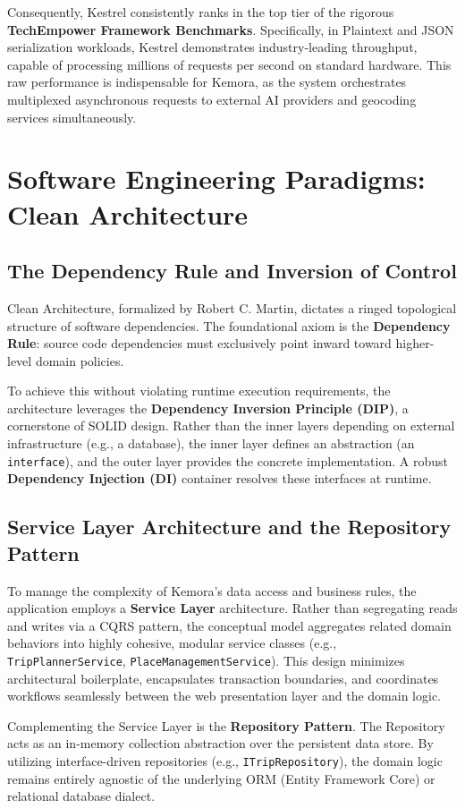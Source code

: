 Consequently, Kestrel consistently ranks in the top tier of the rigorous \textbf{TechEmpower Framework Benchmarks}. Specifically, in Plaintext and JSON serialization workloads, Kestrel demonstrates industry-leading throughput, capable of processing millions of requests per second on standard hardware. This raw performance is indispensable for Kemora, as the system orchestrates multiplexed asynchronous requests to external AI providers and geocoding services simultaneously.

\section{Software Engineering Paradigms: Clean Architecture}
\subsection{The Dependency Rule and Inversion of Control}
Clean Architecture, formalized by Robert C. Martin, dictates a ringed topological structure of software dependencies. The foundational axiom is the \textbf{Dependency Rule}: source code dependencies must exclusively point inward toward higher-level domain policies.

To achieve this without violating runtime execution requirements, the architecture leverages the \textbf{Dependency Inversion Principle (DIP)}, a cornerstone of SOLID design. Rather than the inner layers depending on external infrastructure (e.g., a database), the inner layer defines an abstraction (an \texttt{interface}), and the outer layer provides the concrete implementation. A robust \textbf{Dependency Injection (DI)} container resolves these interfaces at runtime.

\subsection{Service Layer Architecture and the Repository Pattern}
To manage the complexity of Kemora's data access and business rules, the application employs a \textbf{Service Layer} architecture. Rather than segregating reads and writes via a CQRS pattern, the conceptual model aggregates related domain behaviors into highly cohesive, modular service classes (e.g., \texttt{TripPlannerService}, \texttt{PlaceManagementService}). This design minimizes architectural boilerplate, encapsulates transaction boundaries, and coordinates workflows seamlessly between the web presentation layer and the domain logic.

Complementing the Service Layer is the \textbf{Repository Pattern}. The Repository acts as an in-memory collection abstraction over the persistent data store. By utilizing interface-driven repositories (e.g., \texttt{ITripRepository}), the domain logic remains entirely agnostic of the underlying ORM (Entity Framework Core) or relational database dialect.

